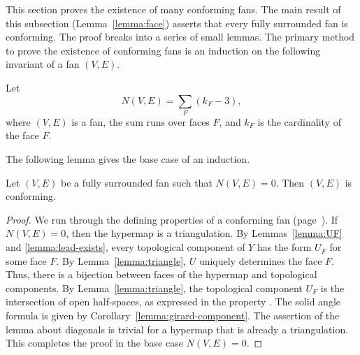 This section proves the existence of many conforming fans.  The main result
of this subsection
(Lemma~\ref{lemma:face}) asserts that every fully surrounded fan is conforming.  The
proof breaks into a series of small lemmas.  The primary
method to prove the existence of conforming fans is an induction on
the following invariant of a fan $(V,E)$.

\begin{definition}[$N(V,E)$]
Let
\[ 
N(V,E) = \sum_F (k_F - 3),
\] 
where $(V,E)$ is a fan, the sum runs over faces $F$, and $k_F$ is the
cardinality of the face $F$.
\end{definition}

The following lemma gives the base case of an induction.

\begin{lemma}[]\cutrate{}\label{lemma:N=0}
Let $(V,E)$ be a fully surrounded fan such that $N(V,E)=0$.
Then $(V,E)$ is conforming.
\end{lemma}
%
%
%

\begin{proof}
  We run through the defining properties of a conforming fan
  (page~\pageref{def:conforming}).  If $N(V,E)=0$, then the hypermap
  is a triangulation.  By Lemmas~\ref{lemma:UF} and
  \ref{lemma:lead-exists}, every topological component of $Y$ has the
  form $U_F$ for some face $F$.  By Lemma~\ref{lemma:triangle}, $U$
  uniquely determines the face $F$.  Thus, there is a bijection
  between faces of the hypermap and topological components.  By
  Lemma~\ref{lemma:triangle}, the topological component $U_F$ is the
  intersection of open half-spaces, as expressed in the property .  
  The solid angle
  formula is given by Corollary~\ref{lemma:girard-component}.  The
  assertion of the lemma about diagonals
is trivial for a hypermap that is already a triangulation. This
completes the proof in the base case $N(V,E)=0$.
\end{proof}

